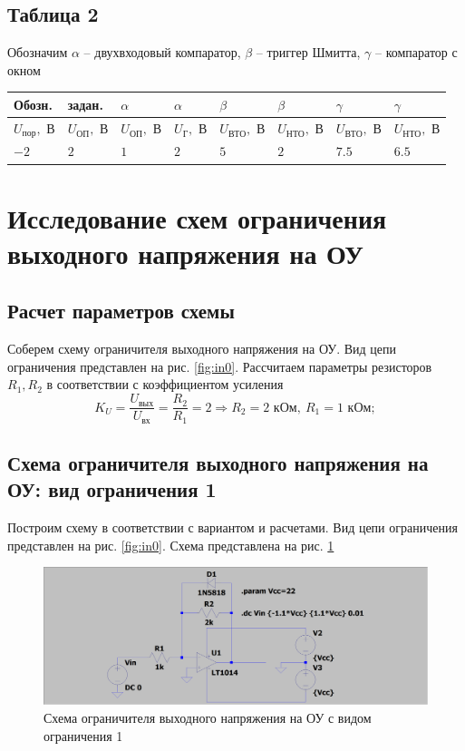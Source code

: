 \documentclass[a4paper, 12pt]{article}
\begin{document}
    \subsection{Таблица 2}
    Обозначим $\alpha$ -- двухвходовый компаратор, $\beta$ -- триггер Шмитта, $\gamma$ -- компаратор с окном
    \begin{center}
        \begin{tabular}{ | m{3.2em} | m{3.2em}| m{3.2em} | m{3em} | m{3.7em} | m{3.7em}| m{3.7em} | m{3.7em} |}
        \hline
        Обозн.& задан.& $\alpha$& $\alpha$& $\beta$& $\beta$& $\gamma$& $\gamma$\\ 
        \hline
        $U_{\text{пор}},$ В&$U_\text{ОП},$ В& $U_\text{ОП},$ В &$U_\text{Г},$ В&$U_\text{ВТО},$ В &$U_\text{НТО},$ В &$U_\text{ВТО},$ В &$U_\text{НТО},$ В\\ 
        \hline
        $-2$& $2$ & $1$ &$2$ &$5$ &$2$ &$7.5$ &$6.5$\\ 
        \hline
        \end{tabular}
    \end{center}


    \section{Исследование схем ограничения выходного напряжения на ОУ}
    \subsection{Расчет параметров схемы}
    Соберем схему ограничителя выходного напряжения на ОУ. Вид цепи ограничения представлен на рис. \ref{fig:in0}.
    Рассчитаем параметры резисторов $R_1,R_2$ в соответствии с коэффициентом усиления
    $$
    K_U=\dfrac{U_\text{вых}}{U_\text{вх}}=\dfrac{R_2}{R_1}=2\Rightarrow R_2=2\text{ кОм},\ R_1=1\text{ кОм};
    $$


    \subsection{Схема ограничителя выходного напряжения на ОУ: вид ограничения 1}
    Построим схему в соответствии с вариантом и расчетами. Вид цепи ограничения представлен на рис. \ref{fig:in0}.
    Схема представлена на рис. \ref{fig:scheme1}
    \begin{figure}[H]
        \centering
        \includegraphics[scale=0.22]{scheme1.png}
        \captionsetup{skip=0pt}
        \caption{Схема ограничителя выходного напряжения на ОУ с видом ограничения 1}
        \label{fig:scheme1}
    \end{figure}
\end{document}
